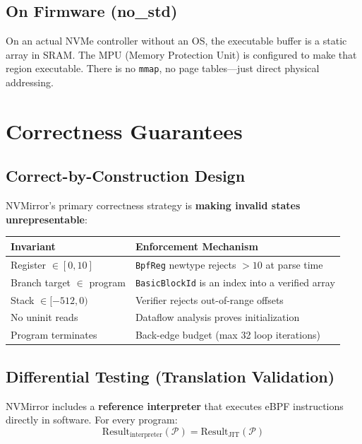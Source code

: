 \documentclass[11pt,letterpaper]{article}
\begin{document}
\subsection{On Firmware (no\_std)}

On an actual NVMe controller without an OS, the executable buffer is a static array in SRAM. The MPU (Memory Protection Unit) is configured to make that region executable. There is no \texttt{mmap}, no page tables---just direct physical addressing.

\section{Correctness Guarantees}
\label{sec:correctness}

\subsection{Correct-by-Construction Design}

NVMirror's primary correctness strategy is \textbf{making invalid states unrepresentable}:

\begin{center}
\begin{tabular}{lp{7cm}}
\toprule
\textbf{Invariant} & \textbf{Enforcement Mechanism} \\
\midrule
Register $\in [0, 10]$ & \texttt{BpfReg} newtype rejects $>10$ at parse time \\
Branch target $\in$ program & \texttt{BasicBlockId} is an index into a verified array \\
Stack $\in [-512, 0)$ & Verifier rejects out-of-range offsets \\
No uninit reads & Dataflow analysis proves initialization \\
Program terminates & Back-edge budget (max 32 loop iterations) \\
\bottomrule
\end{tabular}
\end{center}

\subsection{Differential Testing (Translation Validation)}

NVMirror includes a \textbf{reference interpreter} that executes eBPF instructions directly in software. For every program:
\[
\text{Result}_{\text{interpreter}}(\mathcal{P}) = \text{Result}_{\text{JIT}}(\mathcal{P})
\]
\end{document}
